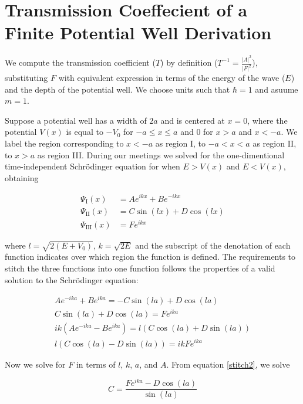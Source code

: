 \documentclass[letterpaper,12pt]{article}
\begin{document}
    \section*{\sloppy Transmission Coeffecient of a Finite Potential Well
    Derivation}

    We compute the transmission coefficient ($T$) by definition ($T^{-1} =
    \frac{\left| A \right| ^{2}}{\left| F \right| ^{2}}$), substituting $F$ with
    equivalent expression in terms of the energy of the wave ($E$) and the
    depth of the potential well. We choose units such that $\hbar = 1$ and
    asuume $m = 1$.

    Suppose a potential well has a width of $2a$ and is centered at $x = 0$,
    where the potential $V(x)$ is equal to $-V_0$ for $-a \leq x \leq a$ and $0$
    for $x > a$ and $x < -a$. We label the region corresponding to $x < -a$ as
    region I, to $-a < x < a$ as region II, to $x > a$ as region III. During our
    meetings we solved for the one-dimentional time-independent Schrödinger
    equation for when $E > V(x)$ and $E < V(x)$, obtaining

    \begin{align*}
        \Psi_\mathrm{I}(x) &= Ae^{ikx} + Be^{-ikx} \\
        \Psi_{\mathrm{II}}(x) &= C\sin(lx) + D\cos(lx) \\
        \Psi_{\mathrm{III}}(x) &= Fe^{ikx}
    \end{align*}

    where $l = \sqrt{2(E + V_0)}$, $k = \sqrt{2E}$ and the subscript of the
    denotation of each function indicates over which region the function is
    defined. The requirements to stitch the three functions into one function
    follows the properties of a valid solution to the Schrödinger equation:

    \begin{gather}
        Ae^{-ika} + Be^{ika} = -C\sin(la) + D\cos(la) \label{stitch1} \\
        C\sin(la) + D\cos(la) = Fe^{ika} \label{stitch2} \\
        ik(Ae^{-ika} - Be^{ika}) = l(C\cos(la) + D\sin(la)) \label{stitch3} \\
        l(C\cos(la) - D\sin(la)) = ikFe^{ika} \label{stitch4}
    \end{gather}

    Now we solve for $F$ in terms of $l$, $k$, $a$, and $A$. From
    equation \eqref{stitch2}, we solve

    \begin{equation}
        C = \frac{Fe^{ika} - D\cos(la)}{\sin(la)} \label{CinD}
    \end{equation}
\end{document}
